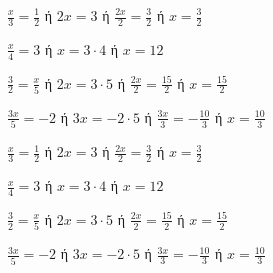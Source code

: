 \begin{alist}
\item $ \frac{x}{3}=\frac{1}{2} $ ή $ 2x=3 $ ή $ \frac{2x}{2}=\frac{3}{2} $ ή $ x=\frac{3}{2} $
\item $ \frac{x}{4}=3 $ ή $ x=3\cdot 4 $ ή $ x=12 $
\item $ \frac{3}{2}=\frac{x}{5} $ ή $ 2x=3\cdot 5 $ ή $ \frac{2x}{2}=\frac{15}{2} $ ή $ x=\frac{15}{2} $
\item $ \frac{3x}{5}=-2 $ ή $ 3x=-2\cdot 5 $ ή $ \frac{3x}{3}=-\frac{10}{3} $ ή $ x=\frac{10}{3} $
\end{alist}
\begin{alist}
\item $ \frac{x}{3}=\frac{1}{2} $ ή $ 2x=3 $ ή $ \frac{2x}{2}=\frac{3}{2} $ ή $ x=\frac{3}{2} $
\item $ \frac{x}{4}=3 $ ή $ x=3\cdot 4 $ ή $ x=12 $
\item $ \frac{3}{2}=\frac{x}{5} $ ή $ 2x=3\cdot 5 $ ή $ \frac{2x}{2}=\frac{15}{2} $ ή $ x=\frac{15}{2} $
\item $ \frac{3x}{5}=-2 $ ή $ 3x=-2\cdot 5 $ ή $ \frac{3x}{3}=-\frac{10}{3} $ ή $ x=\frac{10}{3} $
\end{alist}
